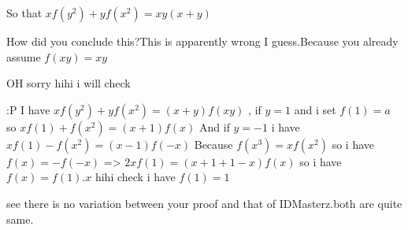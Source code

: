 \begin{solution}
	\begin{tcolorbox} So that $xf(y^{2})+yf(x^{2})=xy(x+y)$ \end{tcolorbox}
How did you conclude this?This is apparently wrong I guess.Because you already assume $f(xy)=xy$ 
\end{solution}



\begin{solution}
	OH sorry hihi  i will check
\end{solution}



\begin{solution}
	:P I have $xf(y^{2})+yf(x^{2})=(x+y)f(xy)$ , if $y=1$ and i set $f(1)=a$ so $xf(1)+f(x^{2})=(x+1)f(x)$
And if $y=-1$ i have $xf(1)-f(x^{2})=(x-1)f(-x)$
Because $f(x^{3})=xf(x^{2})$ so i have $f(x)=-f(-x)$ => $2xf(1)=(x+1+1-x)f(x)$ so i have $f(x)=f(1).x$ hihi check i have $f(1)=1$
\end{solution}



\begin{solution}
	see there is no variation between your proof and that of IDMasterz.both are quite same.
\end{solution}



